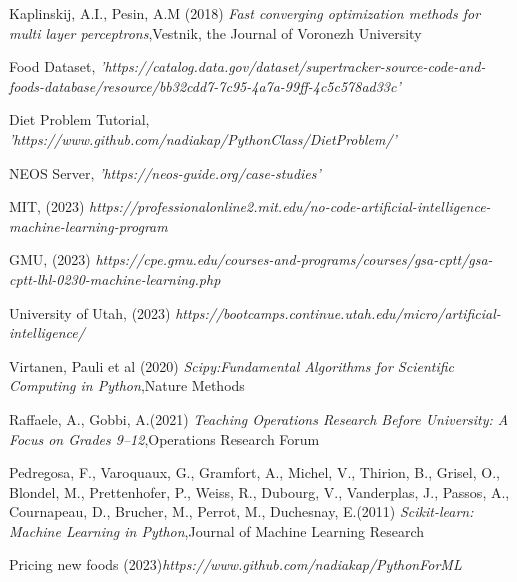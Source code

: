 \documentclass{article} %
\begin{document}
\begin{thebibliography}{9}
Kaplinskij, A.I., Pesin, A.M (2018) \emph{ Fast converging optimization methods for multi layer perceptrons},Vestnik, the Journal of Voronezh University

Food Dataset, \emph{ 'https://catalog.data.gov/dataset/supertracker-source-code-and-foods-database/resource/bb32cdd7-7c95-4a7a-99ff-4c5c578ad33c'}

Diet Problem Tutorial, \emph{'https://www.github.com/nadiakap/PythonClass/DietProblem/'}

NEOS Server, \emph{ 'https://neos-guide.org/case-studies'}

MIT, (2023) \emph{https://professionalonline2.mit.edu/no-code-artificial-intelligence-machine-learning-program}

GMU, (2023) \emph{ https://cpe.gmu.edu/courses-and-programs/courses/gsa-cptt/gsa-cptt-lhl-0230-machine-learning.php}

University of Utah, (2023) \emph{ https://bootcamps.continue.utah.edu/micro/artificial-intelligence/}

Virtanen, Pauli et al (2020) \emph{Scipy:Fundamental Algorithms for Scientific Computing in Python},Nature Methods


Raffaele, A., Gobbi, A.(2021) \emph{Teaching Operations Research Before University: A Focus on Grades 9–12},Operations Research Forum

Pedregosa, F., Varoquaux, G., Gramfort, A., Michel, V., Thirion, B., Grisel, O., Blondel, M., Prettenhofer, P., Weiss, R., Dubourg, V., Vanderplas, J., Passos, A., Cournapeau, D., Brucher, M., Perrot, M., Duchesnay, E.(2011) \emph{ Scikit-learn: Machine Learning in Python},Journal of Machine Learning Research

Pricing new foods  (2023)\emph{https://www.github.com/nadiakap/PythonForML}

\end{thebibliography}
\end{document}
